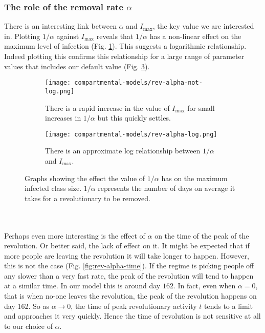 \subsubsection{The role of the removal rate $\alpha$}
There is an interesting link between $\alpha$ and $I_{\max}$, the key value we are interested in. Plotting $1/\alpha$ against $I_{\max}$ reveals that $1/\alpha$ has a non-linear effect on the maximum level of infection (Fig. \ref{fig:rev-alpha-not-log}). This suggests a logarithmic relationship. Indeed plotting this confirms this relationship for a large range of parameter values that includes our default value (Fig. \ref{fig:rev-alpha-log}).
\begin{figure}[h!]
	\begin{subfigure}{\textwidth}
		\centering
		\texttt{[image: compartmental-models/rev-alpha-not-log.png]}
		\caption{There is a rapid increase in the value of $I_{\max}$ for small increases in $1/\alpha$ but this quickly settles.}
		\label{fig:rev-alpha-not-log}
	\end{subfigure}
	\begin{subfigure}{\textwidth}
		\centering
		\texttt{[image: compartmental-models/rev-alpha-log.png]}
		\caption{There is an approximate log relationship between $1/\alpha$ and $I_{\max}$.}
		\label{fig:rev-alpha-log}
	\end{subfigure}
\caption{Graphs showing the effect the value of $1/\alpha$ has on the maximum infected class size. $1/\alpha$ represents the number of days on average it takes for a revolutionary to be removed.}
\end{figure}
\\
\\
Perhaps even more interesting is the effect of $\alpha$ on the time of the peak of the revolution. Or better said, the lack of effect on it. It might be expected that if more people are leaving the revolution it will take longer to happen. However, this is not the case (Fig. \ref{fig:rev-alpha-time}). If the regime is picking people off any slower than a very fast rate, the peak of the revolution will tend to happen at a similar time. In our model this is around day $162$. In fact, even when $\alpha=0$, that is when no-one leaves the revolution, the peak of the revolution happens on day 162. So as $\alpha\rightarrow0$, the time of peak revolutionary activity $t$ tends to a limit and approaches it very quickly. Hence the time of revolution is not sensitive at all to our choice of $\alpha$.
